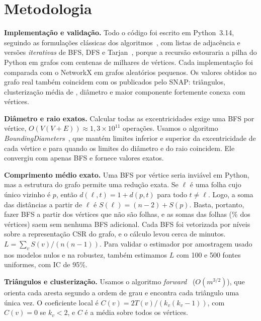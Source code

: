 \documentclass[sigconf]{webmedia}
\begin{document}
\section{Metodologia}
\label{sec:metodologia}

\textbf{Implementação e validação.} Todo o código foi escrito em Python~3.14, seguindo as
formulações clássicas dos algoritmos~\cite{cormen2022}, com listas de adjacência e
versões \emph{iterativas} de BFS, DFS e Tarjan~\cite{tarjan1972}, porque a recursão
estouraria a pilha do Python em grafos com centenas de milhares de vértices. Cada
implementação foi comparada com o NetworkX em grafos aleatórios pequenos. Os valores
obtidos no grafo real também coincidem com os publicados pelo SNAP: \triangulos{} triângulos,
clusterização média de \Ccompleto, diâmetro \diametro{} e maior componente fortemente conexa com
\maiorScc{} vértices.

\textbf{Diâmetro e raio exatos.} Calcular todas as excentricidades exige uma BFS por
vértice, $O(V(V+E)) \approx 1{,}3\times10^{11}$ operações. Usamos o algoritmo
\emph{BoundingDiameters}~\cite{takes2011}, que mantém limites inferior e superior da
excentricidade de cada vértice e para quando os limites do diâmetro e do raio
coincidem. Ele convergiu com apenas \nBfsDiam{} BFS e fornece valores exatos.

\textbf{Comprimento médio exato.} Uma BFS por vértice seria inviável em Python, mas a
estrutura do grafo permite uma redução exata. Se $\ell$ é uma folha cujo único vizinho é
$p$, então $d(\ell,t) = 1 + d(p,t)$ para todo $t \ne \ell$. Logo, a soma das distâncias a
partir de $\ell$ é $S(\ell) = (n-2) + S(p)$. Basta, portanto, fazer BFS a partir dos
\nBfsLexato{} vértices que não são folhas, e as somas das \nFolhasDeduzidas{} folhas
(\pctFolhas\% dos vértices) saem sem nenhuma BFS adicional. Cada BFS foi vetorizada por
níveis sobre a representação CSR do grafo, e o cálculo levou cerca de \minLexato{}
minutos. $L = \sum_v S(v)/(n(n-1))$. Para validar o estimador por amostragem usado nos
modelos nulos e na robustez, também estimamos $L$ com 100 e 500 fontes uniformes, com IC
de 95\%.

\textbf{Triângulos e clusterização.} Usamos o algoritmo \emph{forward}~\cite{schank2005}
($O(m^{3/2})$), que orienta cada aresta segundo a ordem de grau e encontra cada
triângulo uma única vez. O coeficiente local é
$C(v) = 2T(v)/(k_v(k_v-1))$, com $C(v)=0$ se $k_v<2$, e $C$ é a média sobre todos os vértices.
\end{document}
